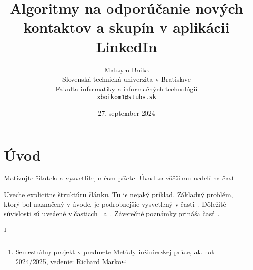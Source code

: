 \documentclass[twoside,slovak,a4paper]{coursepaper}
\title{Algoritmy na odporúčanie nových kontaktov a skupín v aplikácii LinkedIn\centering}
\author{Maksym Boiko\\[2pt]
	{ Slovenská technická univerzita v Bratislave}\\
	{ Fakulta informatiky a informačných technológií}\\
	{ \texttt{xboikom1@stuba.sk}}
	}
\date{\small 27. september 2024}
\begin{document}
\maketitle

\section{Úvod}

Motivujte čitateľa a vysvetlite, o čom píšete. Úvod sa väčšinou nedelí na časti.~\cite{Oladipo:article}

Uveďte explicitne štruktúru článku. Tu je nejaký príklad.
Základný problém, ktorý bol naznačený v úvode, je podrobnejšie vysvetlený v časti~.
Dôležité súvislosti sú uvedené v častiach~ a~.
Záverečné poznámky prináša časť~.






















\thanks{Semestrálny projekt v predmete Metódy inžinierskej práce, ak. rok 2024/2025, vedenie: Richard Marko}


 
\end{document}
